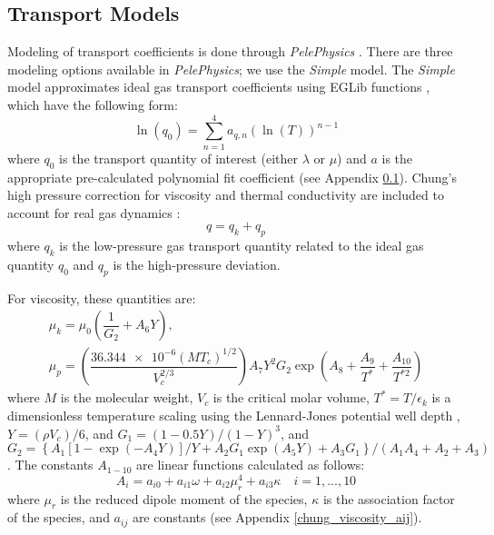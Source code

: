 \subsection{Transport Models}
Modeling of transport coefficients is done through \textit{PelePhysics} \cite{}. There are three modeling options available in \textit{PelePhysics}; we use the \textit{Simple} model. The \textit{Simple} model approximates ideal gas transport coefficients using EGLib functions \cite{}, which have the following form:
\begin{equation} \label{EGLib}
\ln{(q_0)} = \sum\limits_{n=1}^{4} a_{q,n}\left( \ln{(T)}\right)^{n-1}
\end{equation}
where $q_0$ is the transport quantity of interest (either $\lambda$ or $\mu$) and $a$ is the appropriate pre-calculated polynomial fit coefficient (see Appendix \ref{}). Chung's high pressure correction for viscosity and thermal conductivity are included to account for real gas dynamics \cite{chung:1988}: 
\begin{equation} \label{chung_general}
q = q_k + q_p
\end{equation}
where $q_k$ is the low-pressure gas transport quantity related to the ideal gas quantity $q_0$ and $q_p$ is the high-pressure deviation. 

For viscosity, these quantities are:
\begin{equation}
\begin{split}
\mu_k = \mu_0 \left( \dfrac{1}{G_2} + A_6 Y \right), \\ 
\mu_p = \left(\dfrac{\num{36.344e-6}(MT_c)^{1/2}}{V_c^{2/3}}\right)A_7Y^2G_2\exp(A_8 + \dfrac{A_9}{T^*} + \dfrac{A_{10}}{T^{*2}}) 
\end{split}
\end{equation}
where $M$ is the molecular weight, $V_c$ is the critical molar volume, $T^* = T/\epsilon_k$ is a dimensionless temperature scaling using the Lennard-Jones potential well depth \cite{}, $Y = (\rho V_c)/6$, and $G_1 = (1-0.5Y)/(1-Y)^3$, and $G_2 = \left\{A_1\left[   1-\exp(-A_4Y)\right]/Y + A_2G_1\exp(A_5Y) + A_3G_1 \right\}/(A_1A_4 + A_2 + A_3)$. The constants $A_{1-10}$ are linear functions calculated as follows: 
\begin{equation}
A_i = a_{i0} + a_{i1} \omega + a_{i2} \mu_r^4 + a_{i3} \kappa \quad i = 1,..., 10
\end{equation} 
where $\mu_r$ is the reduced dipole moment of the species, $\kappa$ is the association factor of the species, and $a_{ij}$ are constants (see Appendix \ref{chung_viscosity_aij}).  

